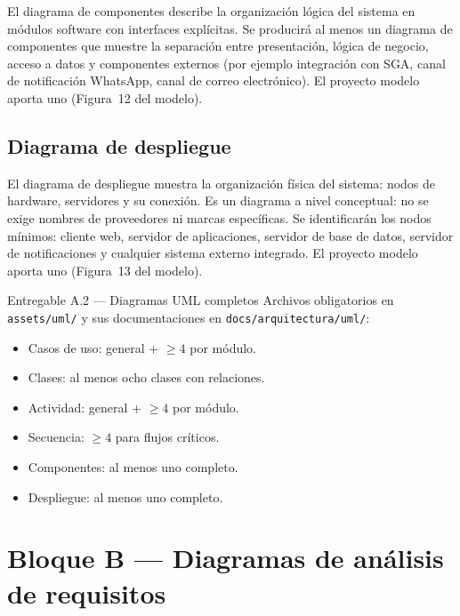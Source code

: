 \documentclass[11pt,a4paper]{article}
\begin{document}
El diagrama de componentes describe la organizaci\'on l\'ogica del sistema en m\'odulos software con interfaces expl\'icitas. Se producir\'a al menos un diagrama de componentes que muestre la separaci\'on entre presentaci\'on, l\'ogica de negocio, acceso a datos y componentes externos (por ejemplo integraci\'on con SGA, canal de notificaci\'on WhatsApp, canal de correo electr\'onico). El proyecto modelo aporta uno (Figura~12 del modelo).

\subsection{Diagrama de despliegue}

El diagrama de despliegue muestra la organizaci\'on f\'isica del sistema: nodos de hardware, servidores y su conexi\'on. Es un diagrama a nivel conceptual: no se exige nombres de proveedores ni marcas espec\'ificas. Se identificar\'an los nodos m\'inimos: cliente web, servidor de aplicaciones, servidor de base de datos, servidor de notificaciones y cualquier sistema externo integrado. El proyecto modelo aporta uno (Figura~13 del modelo).

\begin{cajaentregable}{Entregable A.2 --- Diagramas UML completos}
Archivos obligatorios en \texttt{assets/uml/} y sus documentaciones en \texttt{docs/arquitectura/uml/}:
\begin{itemize}
    \item Casos de uso: general + $\geq 4$ por m\'odulo.
    \item Clases: al menos ocho clases con relaciones.
    \item Actividad: general + $\geq 4$ por m\'odulo.
    \item Secuencia: $\geq 4$ para flujos cr\'iticos.
    \item Componentes: al menos uno completo.
    \item Despliegue: al menos uno completo.
\end{itemize}
\end{cajaentregable}

\section{Bloque B --- Diagramas de an\'alisis de requisitos}
\end{document}
